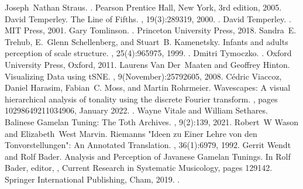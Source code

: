 \documentclass[letterpaper,10pt,english]{sphinxmanual}
\begin{document}
\begin{sphinxthebibliography}{10}
Joseph Nathan Straus. . Pearson Prentice Hall, New York, 3rd edition, 2005.
\sphinxAtStartPar
David Temperley. The Line of Fifths. , 19(3):289\textendash{}319, 2000. .
\sphinxAtStartPar
David Temperley. . MIT Press, 2001.
\sphinxAtStartPar
Gary Tomlinson. . Princeton University Press, 2018.
\sphinxAtStartPar
Sandra E. Trehub, E. Glenn Schellenberg, and Stuart B. Kamenetsky. Infants\textquotesingle{} and adults\textquotesingle{} perception of scale structure. , 25(4):965\textendash{}975, 1999. .
\sphinxAtStartPar
Dmitri Tymoczko. . Oxford University Press, Oxford, 2011.
\sphinxAtStartPar
Laurens Van Der Maaten and Geoffrey Hinton. Visualizing Data using t\sphinxhyphen{}SNE. , 9(November):2579\textendash{}2605, 2008.
\sphinxAtStartPar
Cédric Viaccoz, Daniel Harasim, Fabian C. Moss, and Martin Rohrmeier. Wavescapes: A visual hierarchical analysis of tonality using the discrete Fourier transform. , pages 10298649211034906, January 2022. .
\sphinxAtStartPar
Wayne Vitale and William Sethares. Balinese Gamelan Tuning: The Toth Archives. , 9(2):1\textendash{}39, 2021.
\sphinxAtStartPar
Robert W Wason and Elizabeth West Marvin. Riemann\textquotesingle{}s "Ideen zu Einer \textquotesingle{}Lehre von den Tonvorstellungen\textquotesingle{}": An Annotated Translation. , 36(1):69\textendash{}79, 1992.
\sphinxAtStartPar
Gerrit Wendt and Rolf Bader. Analysis and Perception of Javanese Gamelan Tunings. In Rolf Bader, editor, , Current Research in Systematic Musicology, pages 129\textendash{}142. Springer International Publishing, Cham, 2019. .

\end{sphinxthebibliography}
\end{document}
